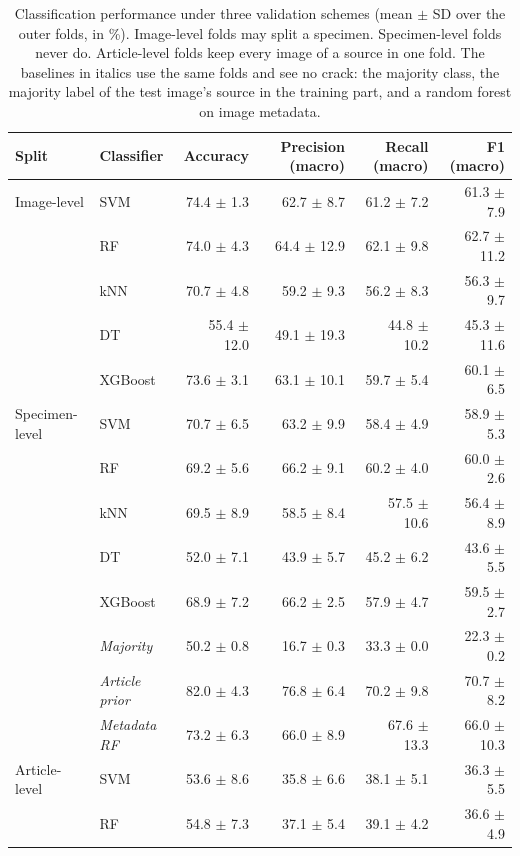 \begin{table}[t]
\centering
\caption{Classification performance under three validation schemes (mean $\pm$ SD over the outer folds, in \%). Image-level folds may split a specimen. Specimen-level folds never do. Article-level folds keep every image of a source in one fold. The baselines in italics use the same folds and see no crack: the majority class, the majority label of the test image's source in the training part, and a random forest on image metadata.}
\label{tab:metrics}
\begin{tabular}{l l r r r r}
\toprule
Split & Classifier & Accuracy & Precision (macro) & Recall (macro) & F1 (macro) \\
\midrule
Image-level & SVM & 74.4 $\pm$ 1.3 & 62.7 $\pm$ 8.7 & 61.2 $\pm$ 7.2 & 61.3 $\pm$ 7.9 \\
 & RF & 74.0 $\pm$ 4.3 & 64.4 $\pm$ 12.9 & 62.1 $\pm$ 9.8 & 62.7 $\pm$ 11.2 \\
 & kNN & 70.7 $\pm$ 4.8 & 59.2 $\pm$ 9.3 & 56.2 $\pm$ 8.3 & 56.3 $\pm$ 9.7 \\
 & DT & 55.4 $\pm$ 12.0 & 49.1 $\pm$ 19.3 & 44.8 $\pm$ 10.2 & 45.3 $\pm$ 11.6 \\
 & XGBoost & 73.6 $\pm$ 3.1 & 63.1 $\pm$ 10.1 & 59.7 $\pm$ 5.4 & 60.1 $\pm$ 6.5 \\
\midrule
Specimen-level & SVM & 70.7 $\pm$ 6.5 & 63.2 $\pm$ 9.9 & 58.4 $\pm$ 4.9 & 58.9 $\pm$ 5.3 \\
 & RF & 69.2 $\pm$ 5.6 & 66.2 $\pm$ 9.1 & 60.2 $\pm$ 4.0 & 60.0 $\pm$ 2.6 \\
 & kNN & 69.5 $\pm$ 8.9 & 58.5 $\pm$ 8.4 & 57.5 $\pm$ 10.6 & 56.4 $\pm$ 8.9 \\
 & DT & 52.0 $\pm$ 7.1 & 43.9 $\pm$ 5.7 & 45.2 $\pm$ 6.2 & 43.6 $\pm$ 5.5 \\
 & XGBoost & 68.9 $\pm$ 7.2 & 66.2 $\pm$ 2.5 & 57.9 $\pm$ 4.7 & 59.5 $\pm$ 2.7 \\
 & \textit{Majority} & 50.2 $\pm$ 0.8 & 16.7 $\pm$ 0.3 & 33.3 $\pm$ 0.0 & 22.3 $\pm$ 0.2 \\
 & \textit{Article prior} & 82.0 $\pm$ 4.3 & 76.8 $\pm$ 6.4 & 70.2 $\pm$ 9.8 & 70.7 $\pm$ 8.2 \\
 & \textit{Metadata RF} & 73.2 $\pm$ 6.3 & 66.0 $\pm$ 8.9 & 67.6 $\pm$ 13.3 & 66.0 $\pm$ 10.3 \\
\midrule
Article-level & SVM & 53.6 $\pm$ 8.6 & 35.8 $\pm$ 6.6 & 38.1 $\pm$ 5.1 & 36.3 $\pm$ 5.5 \\
 & RF & 54.8 $\pm$ 7.3 & 37.1 $\pm$ 5.4 & 39.1 $\pm$ 4.2 & 36.6 $\pm$ 4.9 \\

\end{tabular}
\end{table}
